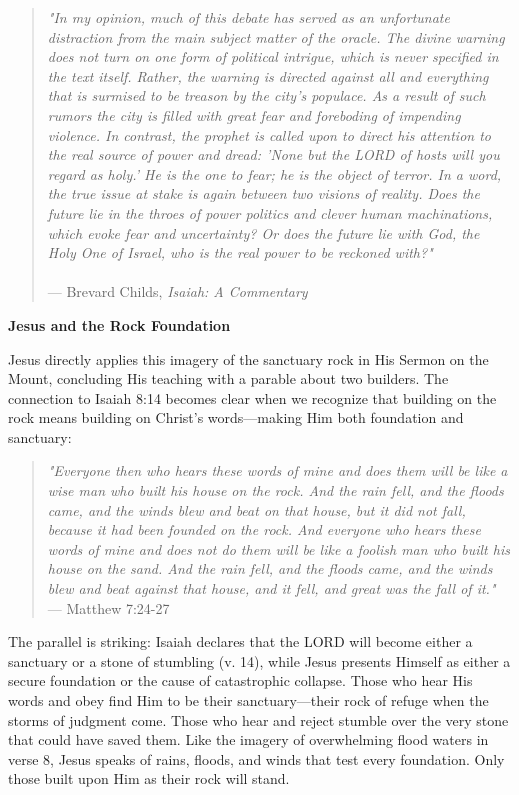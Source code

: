 \documentclass[11pt]{article}
\begin{document}
\begin{quote}
\textit{"In my opinion, much of this debate has served as an unfortunate distraction from the main subject matter of the oracle. The divine warning does not turn on one form of political intrigue, which is never specified in the text itself. Rather, the warning is directed against all and everything that is surmised to be treason by the city's populace. As a result of such rumors the city is filled with great fear and foreboding of impending violence. In contrast, the prophet is called upon to direct his attention to the real source of power and dread: 'None but the LORD of hosts will you regard as holy.' He is the one to fear; he is the object of terror. In a word, the true issue at stake is again between two visions of reality. Does the future lie in the throes of power politics and clever human machinations, which evoke fear and uncertainty? Or does the future lie with God, the Holy One of Israel, who is the real power to be reckoned with?"}\\\\
\hfill --- Brevard Childs, \textit{Isaiah: A Commentary}
\end{quote}

\vspace{3em}
{\large\bfseries Jesus and the Rock Foundation}
\vspace{1em}

Jesus directly applies this imagery of the sanctuary rock in His Sermon on the Mount, concluding His teaching with a parable about two builders. The connection to Isaiah 8:14 becomes clear when we recognize that building on the rock means building on Christ's words—making Him both foundation and sanctuary:
\newpage
\begin{quote}
\textit{"Everyone then who hears these words of mine and does them will be like a wise man who built his house on the rock. And the rain fell, and the floods came, and the winds blew and beat on that house, but it did not fall, because it had been founded on the rock. And everyone who hears these words of mine and does not do them will be like a foolish man who built his house on the sand. And the rain fell, and the floods came, and the winds blew and beat against that house, and it fell, and great was the fall of it."}\\
\hfill --- Matthew 7:24-27
\end{quote}

\vspace{1em}
The parallel is striking: Isaiah declares that the LORD will become either a sanctuary or a stone of stumbling (v. 14), while Jesus presents Himself as either a secure foundation or the cause of catastrophic collapse. Those who hear His words and obey find Him to be their sanctuary—their rock of refuge when the storms of judgment come. Those who hear and reject stumble over the very stone that could have saved them. Like the imagery of overwhelming flood waters in verse 8, Jesus speaks of rains, floods, and winds that test every foundation. Only those built upon Him as their rock will stand.
\end{document}
